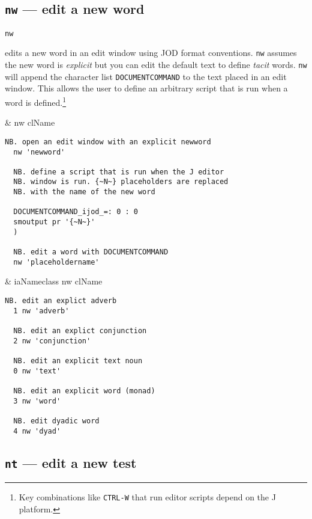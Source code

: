 \subsection{\texttt{nw} --- edit a new word}\label{ss:nw} 

\hypertarget{il:nw}{\texttt{nw}} edits a new  word in 
an edit window using JOD format conventions. \texttt{nw} assumes the
new word is  \emph{explicit} but you can edit the default text to define \emph{tacit} words. 
\texttt{nw} will append the 
character list \texttt{DOCUMENTCOMMAND} to the text placed in an edit window.  
This allows the user to define an arbitrary script that is run when a word is defined.\footnote{
Key combinations like \texttt{CTRL-W} that run editor scripts depend on the J platform.
}

\begin{wordhead}
\monad & nw clName \\
\end{wordhead}
\begin{lstlisting}[frame=single,framerule=0pt] 
  NB. open an edit window with an explicit newword
  nw 'newword'  

  NB. define a script that is run when the J editor
  NB. window is run. {~N~} placeholders are replaced
  NB. with the name of the new word

  DOCUMENTCOMMAND_ijod_=: 0 : 0
  smoutput pr '{~N~}'
  )

  NB. edit a word with DOCUMENTCOMMAND
  nw 'placeholdername'
\end{lstlisting}

\begin{wordhead}
\dyad & iaNameclass nw clName \\
\end{wordhead}
\begin{lstlisting}[frame=single,framerule=0pt]
  NB. edit an explict adverb
  1 nw 'adverb'   

  NB. edit an explict conjunction
  2 nw 'conjunction'  

  NB. edit an explicit text noun
  0 nw 'text'  

  NB. edit an explicit word (monad)
  3 nw 'word'  

  NB. edit dyadic word
  4 nw 'dyad'  
\end{lstlisting}

\subsection{\texttt{nt} --- edit a new test}\label{ss:nt}

